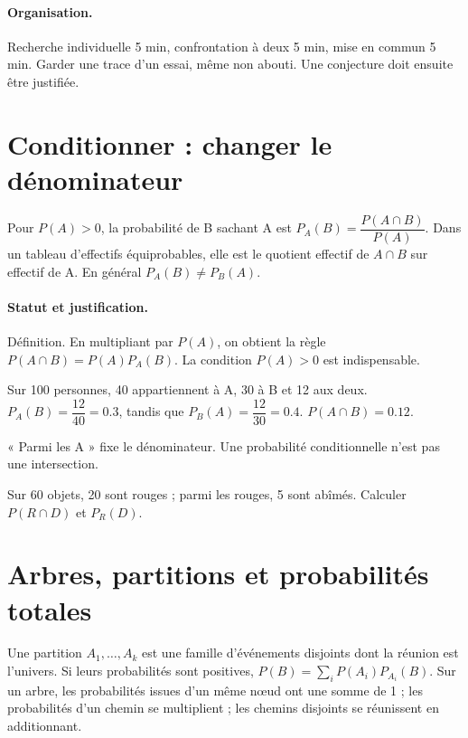 \paragraph{Organisation.} Recherche individuelle 5 min, confrontation à deux 5 min, mise en commun 5 min. Garder une trace d’un essai, même non abouti. Une conjecture doit ensuite être justifiée.
\mxnewpage
\section{Conditionner : changer le dénominateur}\label{C05-U1}
\begin{keypoint}
Pour $P(A)>0$, la probabilité de B sachant A est $P_A(B)=\dfrac{P(A\cap B)}{P(A)}$. Dans un tableau d’effectifs équiprobables, elle est le quotient effectif de $A\cap B$ sur effectif de A. En général $P_A(B)\ne P_B(A)$.
\end{keypoint}
\paragraph{Statut et justification.} Définition. En multipliant par $P(A)$, on obtient la règle $P(A\cap B)=P(A)P_A(B)$. La condition $P(A)>0$ est indispensable.
\begin{example}Sur 100 personnes, 40 appartiennent à A, 30 à B et 12 aux deux. $P_A(B)=\dfrac{12}{40}=\num{0,3}$, tandis que $P_B(A)=\dfrac{12}{30}=\num{0,4}$. $P(A\cap B)=\num{0,12}$.\end{example}\label{C05-EX1}
\begin{pitfall}« Parmi les A » fixe le dénominateur. Une probabilité conditionnelle n’est pas une intersection.\end{pitfall}
\begin{application}Sur 60 objets, 20 sont rouges ; parmi les rouges, 5 sont abîmés. Calculer $P(R\cap D)$ et $P_R(D)$.\end{application}\label{C05-AP1}
\section{Arbres, partitions et probabilités totales}\label{C05-U2}
\begin{keypoint}
Une partition $A_1,\ldots,A_k$ est une famille d’événements disjoints dont la réunion est l’univers. Si leurs probabilités sont positives, $P(B)=\sum_iP(A_i)P_{A_i}(B)$. Sur un arbre, les probabilités issues d’un même nœud ont une somme de 1 ; les probabilités d’un chemin se multiplient ; les chemins disjoints se réunissent en additionnant.
\end{keypoint}
